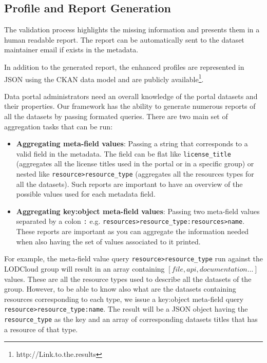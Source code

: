 \documentclass[runningheads,a4paper]{llncs}
\begin{document}


\subsection{Profile and Report Generation}

The validation process highlights the missing information and presents them in a human readable report. The report can be automatically sent to the dataset maintainer email if exists in the metadata.

In addition to the generated report, the enhanced profiles are represented in JSON using the CKAN data model and are publicly available\footnote{http://Link.to.the.results}.

Data portal administrators need an overall knowledge of the portal datasets and their properties. Our framework has the ability to generate numerous reports of all the datasets by passing formated queries. There are two main set of aggregation tasks that can be run:
\begin{itemize}
  \item \textbf{Aggregating meta-field values}: Passing a string that corresponds to a valid field in the metadata. The field can be flat like \texttt{license\_title} (aggregates all the license titles used in the portal or in a specific group) or nested like \texttt{resource>resource\_type} (aggregates all the resources types for all the datasets). Such reports are important to have an overview of the possible values used for each metadata field.
  \item \textbf{Aggregating key:object meta-field values}: Passing two meta-field values separated by a colon \texttt{:} e.g. \texttt{resources>resource\_type:resources>name}. These reports are important as you can aggregate the information needed when also having the set of values associated to it printed.
\end{itemize}

For example, the meta-field value query \texttt{resource>resource\_type} run against the LODCloud group will result in an array containing $[file,api,documentation ...]$ values. These are all the resource types used to describe all the datasets of the group. However, to be able to know also what are the datasets containing resources corresponding to each type, we issue a key:object meta-field query \texttt{resource>resource\_type:name}. The result will be a JSON object having the \texttt{resource\_type} as the key and an array of corresponding datasets titles that has a resource of that type.
\end{document}
